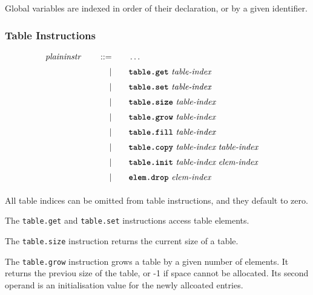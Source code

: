 Global variables are indexed in order of their declaration, or by a given identifier. \vspace{1em}

\subsubsection{Table Instructions}
\begin{alignat*}{9}
    && \textit{plaininstr}\ &&\quad ::= &\quad && \dots \quad &&  \\[1mm]
    &&       &&\quad | &\quad && \textbf{\texttt{table.get}}\ \textit{table-index}\ \quad &&  \\[1mm]
    &&       &&\quad | &\quad && \textbf{\texttt{table.set}}\ \textit{table-index}\ \quad &&  \\[1mm]
    &&       &&\quad | &\quad && \textbf{\texttt{table.size}}\ \textit{table-index}\ \quad &&  \\[1mm]
    &&       &&\quad | &\quad && \textbf{\texttt{table.grow}}\ \textit{table-index}\ \quad &&  \\[1mm]
    &&       &&\quad | &\quad && \textbf{\texttt{table.fill}}\ \textit{table-index}\ \quad &&  \\[1mm]
    &&       &&\quad | &\quad && \textbf{\texttt{table.copy}}\ \textit{table-index}\ \textit{table-index}\ \quad &&  \\[1mm]
    &&       &&\quad | &\quad && \textbf{\texttt{table.init}}\ \textit{table-index}\ \textit{elem-index}\ \quad &&  \\[1mm]
    &&       &&\quad | &\quad && \textbf{\texttt{elem.drop}}\ \textit{elem-index}\ \quad &&  \\[1mm]
\end{alignat*}

All table indices can be omitted from table instructions, and they default to zero.



The \texttt{table.get} and \texttt{table.set} instructions access table elements. \vspace{1em}

The \texttt{table.size} instruction returns the current size of a table. \vspace{1em}

The \texttt{table.grow} instruction grows a table by a given number of elements. It returns the previou size of the table, or -1 if space cannot be allocated. Its second operand is an initialisation value for the newly allcoated entries. \vspace{1em}

